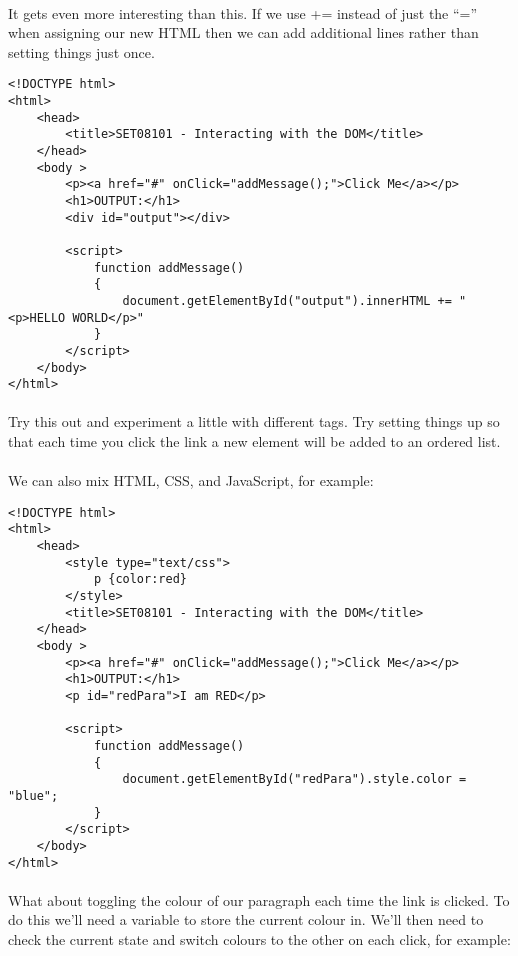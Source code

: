\documentclass[10pt, a4paper]{article}
\begin{document}
\paragraph{} It gets even more interesting than this. If we use += instead of just the ``='' when assigning our new HTML then we can add additional lines rather than setting things just once. 

\begin{lstlisting}
<!DOCTYPE html>
<html>
    <head> 
        <title>SET08101 - Interacting with the DOM</title>
    </head>
    <body >
        <p><a href="#" onClick="addMessage();">Click Me</a></p>
        <h1>OUTPUT:</h1>
        <div id="output"></div>

        <script>
            function addMessage() 
            { 
                document.getElementById("output").innerHTML += "<p>HELLO WORLD</p>"
            }      
        </script>
    </body>
</html>
\end{lstlisting}


\paragraph{} Try this out and experiment a little with different tags. Try setting things up so that each time you click the link a new element will be added to an ordered list.

\paragraph{} We can also mix HTML, CSS, and JavaScript, for example:

\begin{lstlisting}
<!DOCTYPE html>
<html>
    <head>
        <style type="text/css">
            p {color:red}
        </style>
        <title>SET08101 - Interacting with the DOM</title>
    </head>
    <body >
        <p><a href="#" onClick="addMessage();">Click Me</a></p>
        <h1>OUTPUT:</h1>
        <p id="redPara">I am RED</p>

        <script>
            function addMessage() 
            { 
                document.getElementById("redPara").style.color = "blue";
            }      
        </script>
    </body>
</html>
\end{lstlisting}

\paragraph{} What about toggling the colour of our paragraph each time the link is clicked. To do this we'll need a variable to store the current colour in. We'll then need to check the current state and switch colours to the other on each click, for example:
\end{document}
